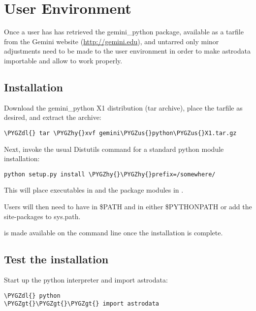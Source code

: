 \documentclass[letterpaper,10pt,english]{sphinxmanual}
\def\PYGZus{\char`\_}
\def\PYGZgt{\char`\>}
\def\PYGZdl{\char`\$}
\def\PYGZhy{\char`\-}
\begin{document}
\chapter{User Environment}
\label{userenv::doc}\label{userenv:user-environment}
Once a user has has retrieved the gemini\_python package, available as a tarfile
from the Gemini website (\href{http://gemini.edu}{http://gemini.edu}), and untarred only minor adjustments need
to be made to the user environment in order to make astrodata importable and
allow  to work properly.


\section{Installation}
\label{userenv:installation}\label{userenv:config}
Download the gemini\_python X1 distribution (tar archive), place the tarfile as
desired, and extract the archive:

\begin{Verbatim}[commandchars=\\\{\}]
\PYGZdl{} tar \PYGZhy{}xvf gemini\PYGZus{}python\PYGZus{}X1.tar.gz
\end{Verbatim}

Next, invoke the usual Distutils command for a standard python module installation:

\begin{Verbatim}[commandchars=\\\{\}]
python setup.py install \PYGZhy{}\PYGZhy{}prefix=/somewhere/
\end{Verbatim}

This will place executables in  and the package modules in
.

Users will then need to have  in \$PATH and
 in either \$PYTHONPATH or add the
site-packages to sys.path.

 is made available on the command line once the installation is complete.


\section{Test the installation}
\label{userenv:test-the-installation}
Start up the python interpreter and import astrodata:

\begin{Verbatim}[commandchars=\\\{\}]
\PYGZdl{} python
\PYGZgt{}\PYGZgt{}\PYGZgt{} import astrodata
\end{Verbatim}
\end{document}

